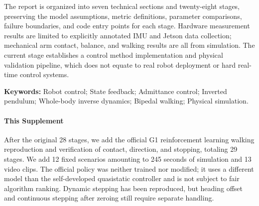 The report is organized into seven technical sections and twenty-eight stages, preserving the model assumptions, metric definitions, parameter comparisons, failure boundaries, and code entry points for each stage. Hardware measurement results are limited to explicitly annotated IMU and Jetson data collection; mechanical arm contact, balance, and walking results are all from simulation. The current stage establishes a control method implementation and physical validation pipeline, which does not equate to real robot deployment or hard real-time control systems.

\noindent\textbf{Keywords:} Robot control; State feedback; Admittance control; Inverted pendulum; Whole-body inverse dynamics; Bipedal walking; Physical simulation.

\paragraph{This Supplement} After the original 28 stages, we add the official G1 reinforcement learning walking reproduction and verification of contact, direction, and stopping, totaling 29 stages. We add 12 fixed scenarios amounting to 245 seconds of simulation and 13 video clips. The official policy was neither trained nor modified; it uses a different model than the self-developed quasistatic controller and is not subject to fair algorithm ranking. Dynamic stepping has been reproduced, but heading offset and continuous stepping after zeroing still require separate handling.

